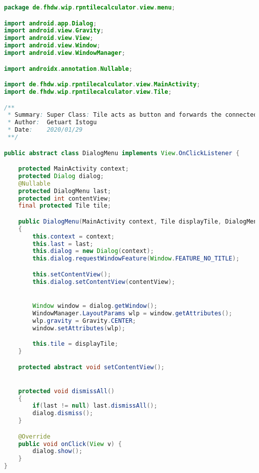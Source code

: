 \begin{lstlisting}[caption=DialogMenu,label=list:DialogMenu,language=Java]
package de.fhdw.wip.rpntilecalculator.view.menu;

import android.app.Dialog;
import android.view.Gravity;
import android.view.View;
import android.view.Window;
import android.view.WindowManager;

import androidx.annotation.Nullable;

import de.fhdw.wip.rpntilecalculator.view.MainActivity;
import de.fhdw.wip.rpntilecalculator.view.Tile;

/**
 * Summary: Super Class: Tile acts as button and forwards the connected type and click to the handler
 * Author:  Getuart Istogu
 * Date:    2020/01/29
 **/

public abstract class DialogMenu implements View.OnClickListener {

    protected MainActivity context;
    protected Dialog dialog;
    @Nullable
    protected DialogMenu last;
    protected int contentView;
    final protected Tile tile;

    public DialogMenu(MainActivity context, Tile displayTile, DialogMenu last)
    {
        this.context = context;
        this.last = last;
        this.dialog = new Dialog(context);
        this.dialog.requestWindowFeature(Window.FEATURE_NO_TITLE);

        this.setContentView();
        this.dialog.setContentView(contentView);


        Window window = dialog.getWindow();
        WindowManager.LayoutParams wlp = window.getAttributes();
        wlp.gravity = Gravity.CENTER;
        window.setAttributes(wlp);

        this.tile = displayTile;
    }

    protected abstract void setContentView();


    protected void dismissAll()
    {
        if(last != null) last.dismissAll();
        dialog.dismiss();
    }

    @Override
    public void onClick(View v) {
        dialog.show();
    }
}
\end{lstlisting}    

